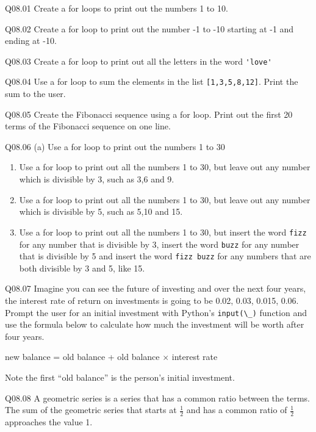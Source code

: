\documentclass{book}
\newenvironment{problems}{}{}  %
\newcommand{\passthrough}[1]{#1}
\begin{document}
    
        \begin{problems}
        Q08.01 Create a for loops to print out the numbers 1 to 10.

Q08.02 Create a for loop to print out the number -1 to -10 starting at
-1 and ending at -10.

Q08.03 Create a for loop to print out all the letters in the word
\passthrough{\lstinline!'love'!}

Q08.04 Use a for loop to sum the elements in the list
\passthrough{\lstinline![1,3,5,8,12]!}. Print the sum to the user.

Q08.05 Create the Fibonacci sequence using a for loop. Print out the
first 20 terms of the Fibonacci sequence on one line.

Q08.06 (a) Use a for loop to print out the numbers 1 to 30

\begin{enumerate}
\def\labelenumi{(\alph{enumi})}
\setcounter{enumi}{1}
\item
  Use a for loop to print out all the numbers 1 to 30, but leave out any
  number which is divisible by 3, such as 3,6 and 9.
\item
  Use a for loop to print out all the numbers 1 to 30, but leave out any
  number which is divisible by 5, such as 5,10 and 15.
\item
  Use a for loop to print out all the numbers 1 to 30, but insert the
  word \passthrough{\lstinline!fizz!} for any number that is divisible
  by 3, insert the word \passthrough{\lstinline!buzz!} for any number
  that is divisible by 5 and insert the word
  \passthrough{\lstinline!fizz buzz!} for any numbers that are both
  divisible by 3 and 5, like 15.
\end{enumerate}

Q08.07 Imagine you can see the future of investing and over the next
four years, the interest rate of return on investments is going to be
0.02, 0.03, 0.015, 0.06. Prompt the user for an initial investment with
Python's \passthrough{\lstinline!input(\_)!} function and use the
formula below to calculate how much the investment will be worth after
four years.

new balance = old balance + old balance \(\times\) interest rate

Note the first ``old balance'' is the person's initial investment.

Q08.08 A geometric series is a series that has a common ratio between
the terms. The sum of the geometric series that starts at
\(\frac{1}{2}\) and has a common ratio of \(\frac{1}{2}\) approaches the
value 1.


\end{problems}
\end{document}
